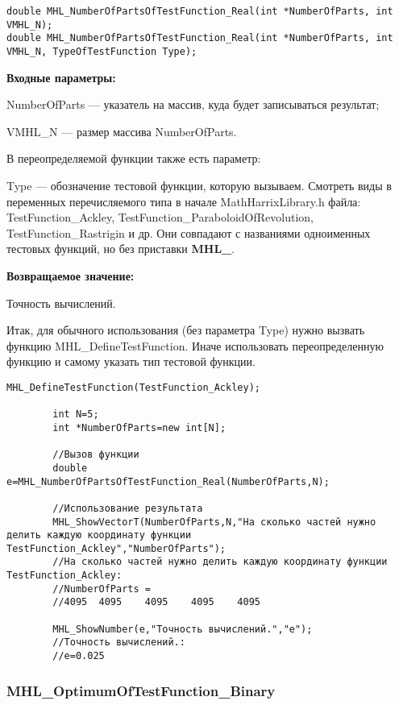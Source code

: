\documentclass[a4paper,12pt]{article}
\begin{document}
\begin{lstlisting}[label=code_syntax_MHL_NumberOfPartsOfTestFunction_Real,caption=Синтаксис]
double MHL_NumberOfPartsOfTestFunction_Real(int *NumberOfParts, int VMHL_N);
double MHL_NumberOfPartsOfTestFunction_Real(int *NumberOfParts, int VMHL_N, TypeOfTestFunction Type);
\end{lstlisting}

\textbf{Входные параметры:}

NumberOfParts --- указатель на массив, куда будет записываться результат;

VMHL\_N --- размер массива NumberOfParts.

В переопределяемой функции также есть параметр:
  
Type --- обозначение тестовой функции, которую вызываем.
Смотреть виды в переменных перечисляемого типа в начале MathHarrixLibrary.h файла: TestFunction\_Ackley, TestFunction\_ParaboloidOfRevolution, TestFunction\_Rastrigin и др. Они совпадают с названиями одноименных тестовых функций, но без приставки \textbf{MHL\_}.

\textbf{Возвращаемое значение:}
 
Точность вычислений.

Итак, для обычного использования (без параметра Type) нужно вызвать функцию MHL\_DefineTestFunction. Иначе использовать переопределенную функцию и самому указать тип тестовой функции.


\begin{lstlisting}[label=code_use_MHL_NumberOfPartsOfTestFunction_Real,caption=Пример использования]
        MHL_DefineTestFunction(TestFunction_Ackley);

        int N=5;
        int *NumberOfParts=new int[N];

        //Вызов функции
        double e=MHL_NumberOfPartsOfTestFunction_Real(NumberOfParts,N);

        //Использование результата
        MHL_ShowVectorT(NumberOfParts,N,"На сколько частей нужно делить каждую координату функции TestFunction_Ackley","NumberOfParts");
        //На сколько частей нужно делить каждую координату функции TestFunction_Ackley:
        //NumberOfParts =	
        //4095	4095	4095	4095	4095

        MHL_ShowNumber(e,"Точность вычислений.","e");
        //Точность вычислений.:
        //e=0.025
\end{lstlisting}

\subsubsection{MHL\_OptimumOfTestFunction\_Binary}\label{MHL_OptimumOfTestFunction_Binary}
\end{document}

